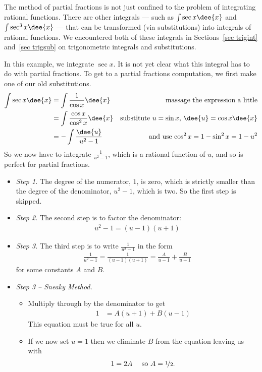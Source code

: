 The method of partial fractions is not just confined to the problem of integrating
rational functions. There are other integrals --- such as $\int\sec x\dee{x}$ and
$\int \sec^3 x\dee{x}$ --- that can be transformed (via substitutions) into integrals of
rational functions. We encountered both of these integrals in Sections~\ref{sec trigint}
and~\ref{sec trigsub} on trigonometric integrals and substitutions.
\begin{eg} \label{eg:PFe}

\soln
In this example, we integrate $\sec x$. It is not yet clear what this integral
has to do with partial fractions. To get to a partial fractions computation,
we first make one of our old substitutions.
\begin{align*}
\int \sec x\dee{x}
  &= \int\frac{1}{\cos x}\dee{x} & \text{massage the expression a little}\\
  &= \int\frac{\cos x}{\cos^2 x}\dee{x} & \text{substitute $u=\sin x$,\ $\dee{u} = \cos
x\dee{x}$}\\
  &= -\int \frac{\dee{u}}{u^2-1} & \text{and use $\cos^2x=1-\sin^2x=1-u^2$}
\end{align*}
So we now have to integrate $\frac{1}{u^2-1}$, which is a rational function
of $u$, and so is perfect for partial fractions.

\begin{itemize}
 \item \emph{Step 1.}  The degree of the numerator, $1$, is zero, which
is strictly smaller than the degree of the denominator, $u^2-1$, which
is two. So the first step is skipped.

\item \emph{Step 2.}
The second step is to factor the denominator:
\begin{align*}
u^2-1=(u-1)(u+1)
\end{align*}

\item \emph{Step 3.}
The third step is to write $\frac{1}{u^2-1}$ in the form
\begin{align*}
\frac{1}{u^2-1}
=\frac{1}{(u-1)(u+1)}
=\frac{A}{u-1}+\frac{B}{u+1}
\end{align*}
for some constants $A$ and $B$.

\item \emph{Step 3 -- Sneaky Method.}
\begin{itemize}
\item Multiply through by the denominator to get
\begin{align*}
  1 &= A(u+1) + B(u-1)
\end{align*}
This equation must be true for all $u$.
\item If we now set $u=1$ then we eliminate $B$ from the equation leaving us with
\begin{align*}
  1 &= 2A &\text{ so $A=\nicefrac12$.}
\end{align*}


\end{itemize}
\end{itemize}
\end{eg}
